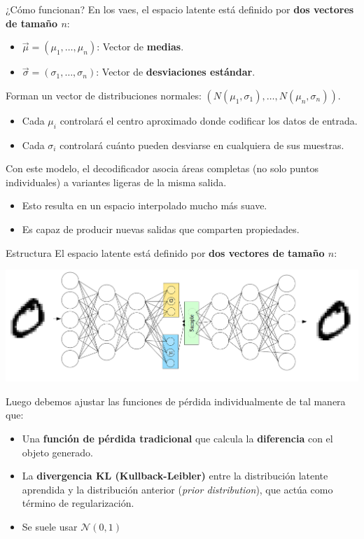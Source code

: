 \begin{frame}{¿Cómo funcionan?}
En los \glspl{vae}, el espacio latente está definido por \textbf{dos vectores de tamaño $n$}:

\begin{itemize}
    \item $\vec{\mu} = (\mu_1, \ldots, \mu_n)$: Vector de \textbf{medias}.
    \item $\vec{\sigma} = (\sigma_1, \ldots, \sigma_n)$: Vector de \textbf{desviaciones estándar}.
\end{itemize}

Forman un vector de distribuciones normales: $(N(\mu_1,\sigma_1),\ldots ,N(\mu_n,\sigma_n))$.

\begin{itemize}
    \item Cada $\mu_i$ controlará el centro aproximado donde codificar los datos de entrada.
    \item Cada $\sigma_i$ controlará cuánto pueden desviarse en cualquiera de sus muestras.
\end{itemize}

Con este modelo, el decodificador asocia áreas completas (no solo puntos individuales) a variantes ligeras de la misma salida.

\begin{itemize}
    \item Esto resulta en un espacio interpolado mucho más suave.
    \item Es capaz de producir nuevas salidas que comparten propiedades.
\end{itemize}
\end{frame}

\begin{frame}{Estructura}
El espacio latente está definido por \textbf{dos vectores de tamaño $n$}:

\begin{center}
\includegraphics[width=.8\textwidth]{Slides/figures/02_Metodos_Generativos/nn-vae.png}
\end{center}

Luego debemos ajustar las funciones de pérdida individualmente de tal manera que:

\begin{itemize}
    \item Una \textbf{función de pérdida tradicional} que calcula la \textbf{diferencia} con el objeto generado.
    \item La \textbf{divergencia KL (Kullback-Leibler)} entre la distribución latente aprendida y la distribución anterior (\textit{prior distribution}), que actúa como término de regularización. 
    \item Se suele usar $\mathcal{N}(0, 1)$
\end{itemize}
\end{frame}

